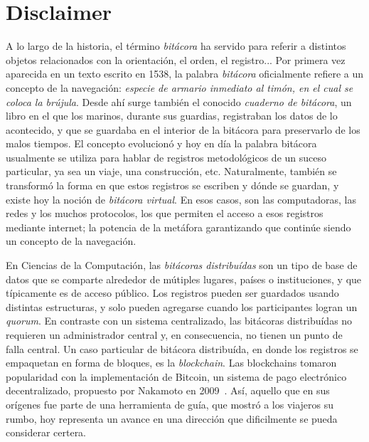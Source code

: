 \section{Disclaimer}


A lo largo de la historia, el término \textit{bitácora} ha servido para referir a
distintos objetos relacionados con la orientación, el orden, el registro... Por
primera vez aparecida en un texto escrito en 1538,
la palabra \textit{bitácora}
oficialmente refiere a un concepto de la navegación: \textit{especie de armario
inmediato al timón, en el cual se coloca la brújula}. Desde ahí surge también
el conocido \textit{cuaderno de bitácora}, un libro en el que los marinos, durante
sus guardias, registraban los datos de lo acontecido, y que se guardaba en el
interior de la bitácora para preservarlo de los malos tiempos. El concepto
evolucionó y hoy en día la palabra bitácora usualmente se utiliza para hablar
de registros metodológicos de un suceso particular, ya sea un viaje, una
construcción, etc. Naturalmente, también se transformó la forma en que estos
registros se escriben y dónde se guardan, y existe hoy la noción de \textit{bitácora
virtual}. En esos casos, son las computadoras, las redes y los muchos protocolos,
los que permiten el acceso a esos registros mediante internet; la potencia de la
metáfora garantizando que continúe siendo un concepto de la navegación.
%

En Ciencias de la Computación, las \textit{bitácoras distribuídas} son un tipo de
base de datos que se comparte
alrededor de mútiples lugares, países o instituciones, y que típicamente es de
acceso público. Los registros pueden ser guardados usando distintas estructuras,
y solo pueden agregarse cuando los participantes logran un \textit{quorum}. En
contraste con un sistema centralizado, las bitácoras distribuídas no requieren
un administrador central y, en consecuencia, no tienen un punto de falla central.
Un caso particular de bitácora distribuída, en donde los registros se empaquetan
en forma de bloques, es la \textit{blockchain}. Las blockchains tomaron popularidad
con la implementación de Bitcoin, un sistema de pago electrónico decentralizado, 
propuesto por Nakamoto en 2009~\cite{nakamoto06bitcoin}.
Así, aquello que en sus orígenes fue parte de una herramienta de guía, que mostró
a los viajeros su rumbo, hoy representa un avance en una dirección que dificilmente se
pueda considerar certera.

